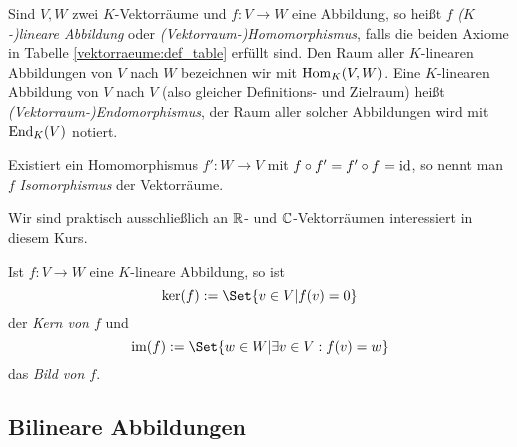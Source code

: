 \begin{definition}
Sind $V,W$ zwei $K$-Vektorräume und $f: V\to W$ eine Abbildung, so heißt $f$ \emph{($K$-)lineare Abbildung} oder \emph{(Vektorraum-)Homomorphismus}, falls die beiden Axiome in Tabelle \ref{vektorraeume:def_table} erfüllt sind. Den Raum aller $K$-linearen Abbildungen von $V$ nach $W$ bezeichnen wir mit $\operatorname{Hom}_K(V,W)$. Eine $K$-linearen Abbildung von $V$ nach $V$ (also gleicher Definitions- und Zielraum) heißt \emph{(Vektorraum-)Endomorphismus}, der Raum aller solcher Abbildungen wird mit $\operatorname{End}_K(V)$ notiert.

Existiert ein Homomorphismus $f': W\to V$ mit $f\circ f'=f'\circ f=\operatorname{id}$, so nennt man $f$ \emph{Isomorphismus} der Vektorräume.
\end{definition}

\begin{remark}
Wir sind praktisch ausschließlich an $\mathbb{R}$- und $\mathbb{C}$-Vektorräumen interessiert in diesem Kurs.
\end{remark}

\begin{definition}
Ist $f: V\to W$ eine $K$-lineare Abbildung, so ist
\[\ker(f) := \Set{v\in V | f(v)=0}\]
der \emph{Kern von $f$} und
\[\im(f) := \Set{w\in W | \exists v\in V: f(v)=w}\]
das \emph{Bild von $f$}.
\end{definition}

\subsection{Bilineare Abbildungen}

